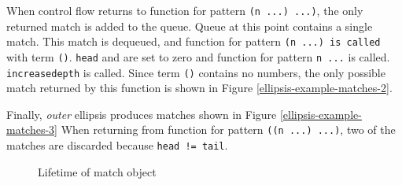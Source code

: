When control flow returns to function for pattern \texttt{(n ...) ...)}, the only returned match is added to the queue. Queue at this point contains a single match. This match is dequeued, and function for pattern \texttt{(n ...) is called} with term \texttt{()}. \texttt{head} and  are set to zero and function for pattern \texttt{n ...} is called. \texttt{increasedepth} is called. Since term \texttt{()} contains no numbers, the only possible match returned by this function is shown in Figure \ref{ellipsis-example-matches-2}.

Finally, \textit{outer} ellipsis produces matches shown in Figure \ref{ellipsis-example-matches-3} When returning from function for pattern \texttt{((n ...) ...)}, two of the matches are discarded because \texttt{head != tail}.


\begin{figure}[H]
\caption{Lifetime of match object}


\end{figure}

